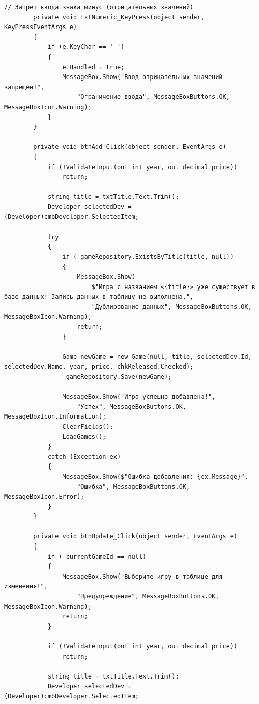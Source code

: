 \documentclass[oneside,a4paper,14pt]{extarticle}
\begin{document}
\begin{lstlisting}[language={[Sharp]C}]
        // Запрет ввода знака минус (отрицательных значений)
        private void txtNumeric_KeyPress(object sender, KeyPressEventArgs e)
        {
            if (e.KeyChar == '-')
            {
                e.Handled = true;
                MessageBox.Show("Ввод отрицательных значений запрещён!",
                    "Ограничение ввода", MessageBoxButtons.OK, MessageBoxIcon.Warning);
            }
        }

        private void btnAdd_Click(object sender, EventArgs e)
        {
            if (!ValidateInput(out int year, out decimal price))
                return;

            string title = txtTitle.Text.Trim();
            Developer selectedDev = (Developer)cmbDeveloper.SelectedItem;

            try
            {
                if (_gameRepository.ExistsByTitle(title, null))
                {
                    MessageBox.Show(
                        $"Игра с названием «{title}» уже существует в базе данных! Запись данных в таблицу не выполнена.",
                        "Дублирование данных", MessageBoxButtons.OK, MessageBoxIcon.Warning);
                    return;
                }

                Game newGame = new Game(null, title, selectedDev.Id, selectedDev.Name, year, price, chkReleased.Checked);
                _gameRepository.Save(newGame);

                MessageBox.Show("Игра успешно добавлена!",
                    "Успех", MessageBoxButtons.OK, MessageBoxIcon.Information);
                ClearFields();
                LoadGames();
            }
            catch (Exception ex)
            {
                MessageBox.Show($"Ошибка добавления: {ex.Message}",
                    "Ошибка", MessageBoxButtons.OK, MessageBoxIcon.Error);
            }
        }

        private void btnUpdate_Click(object sender, EventArgs e)
        {
            if (_currentGameId == null)
            {
                MessageBox.Show("Выберите игру в таблице для изменения!",
                    "Предупреждение", MessageBoxButtons.OK, MessageBoxIcon.Warning);
                return;
            }

            if (!ValidateInput(out int year, out decimal price))
                return;

            string title = txtTitle.Text.Trim();
            Developer selectedDev = (Developer)cmbDeveloper.SelectedItem;


\end{lstlisting}
\end{document}
